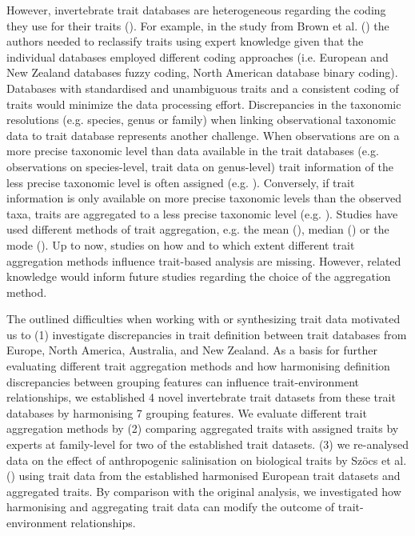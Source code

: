 \documentclass{article}
\begin{document}
However, invertebrate trait databases are heterogeneous regarding the coding they use for their traits (\cite{culp_incorporating_2011}). For example, in the study from Brown et al. (\cite{brown_functional_2018}) the authors needed to reclassify traits using expert knowledge given that the individual databases employed different coding approaches (i.e. European and New Zealand databases fuzzy coding, North American database binary coding). Databases with standardised and unambiguous traits and a consistent coding of traits would minimize the data processing effort. Discrepancies in the taxonomic resolutions (e.g. species, genus or family) when linking observational taxonomic data to trait database represents another challenge. When observations are on a more precise taxonomic level than data available in the trait databases (e.g. observations on species-level, trait data on genus-level) trait information of the less precise taxonomic level is often assigned (e.g. \cite{szocs_effects_2014, vos_taxonomic_2017}). Conversely, if trait information is only available on more precise taxonomic levels than the observed taxa, traits are aggregated to a less precise taxonomic level (e.g. \cite{poff_functional_2006, szocs_effects_2014, piliere_a._f._h._importance_2016, aspin_extreme_2019}). Studies have used different methods of trait aggregation, e.g. the mean (\cite{magliozzi_functional_2019}), median (\cite{szocs_effects_2014}) or the mode (\cite{piliere_a._f._h._importance_2016}). Up to now, studies on how and to which extent different trait aggregation methods influence trait-based analysis are missing. However, related knowledge would inform future studies regarding the choice of the aggregation method.

The outlined difficulties when working with or synthesizing trait data motivated us to (1) investigate discrepancies in trait definition between trait databases from Europe, North America, Australia, and New Zealand. As a basis for further evaluating different trait aggregation methods and how harmonising definition discrepancies between grouping features can influence trait-environment relationships, we established 4 novel invertebrate trait datasets from these trait databases by harmonising 7 grouping features. We evaluate different trait aggregation methods by (2) comparing aggregated traits with assigned traits by experts at family-level for two of the established trait datasets. (3) we re-analysed data on the effect of anthropogenic salinisation on biological traits by Szöcs et al. (\cite{szocs_effects_2014}) using trait data from the established harmonised European trait datasets and aggregated traits. By comparison with the original analysis, we investigated how harmonising and aggregating trait data can modify the outcome of trait-environment relationships.
\end{document}
